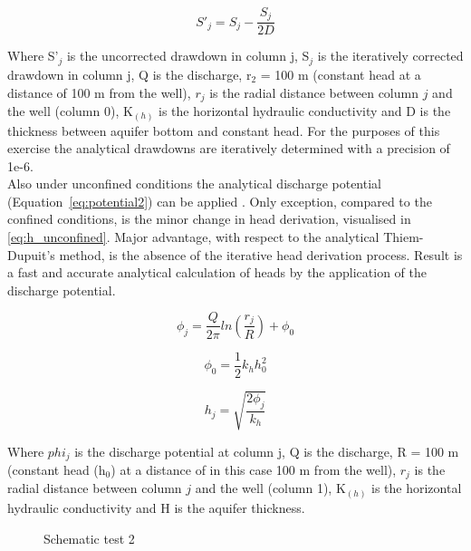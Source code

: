 \begin{equation}
 S'_j = S_j- \frac{S_j}{2D}  
 \label{eq:thiem_unconfined_corrected}
 \end{equation} 
 
Where S'$_j$ is the uncorrected drawdown in column j, S$_j$ is the iteratively corrected drawdown in column j, Q is the discharge, r$_2$ = 100 m (constant head at a distance of 100 m from the well), $r_j$ is the radial distance between column $j$ and the well (column 0), K$_{(h)}$ is the horizontal hydraulic conductivity and D is the thickness between aquifer bottom and constant head. For the purposes of this exercise the analytical drawdowns are iteratively determined with a precision of 1e-6. \\    

Also under unconfined conditions the analytical discharge potential (Equation~\ref{eq:potential2}) can be applied \citep{Bakker2011,Strack1989}. Only exception, compared to the confined conditions, is the minor change in head derivation, visualised in \ref{eq:h_unconfined}. Major advantage, with respect to the analytical Thiem-Dupuit's method, is the absence of the iterative head derivation process. Result is a fast and accurate analytical calculation of heads by the application of the discharge potential. 

\begin{equation}
 \phi_j = \frac{Q}{2\pi} ln(\frac{r_j}{R}) + \phi_0
 \label{eq:potential2}
\end{equation}  

\begin{equation}
 \phi_0 = \frac{1}{2}k_{h}h_0^{2}
 \label{eq:pot_unconfined}
\end{equation}  
 
\begin{equation}
 h_j = \sqrt{\frac{2\phi_j}{k_{h}}}
 \label{eq:h_unconfined}
\end{equation}  

Where $phi_j$ is the discharge potential at column j, Q is the discharge, R = 100 m (constant head (h$_0$) at a distance of in this case 100 m from the well), $r_j$ is the radial distance between column $j$ and the well (column 1), K$_{(h)}$ is the horizontal hydraulic conductivity and H is the aquifer thickness.\\

\begin{figure}[h]
\centering
{}
\captionsetup{justification=centering}
\caption{Schematic test 2}
\label{fig:Schematictest2}
\end{figure}

